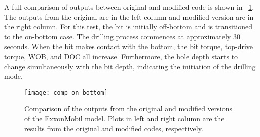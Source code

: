 A full comparison of outputs between original and modified code is shown in \figurename~\ref{Comaprison_on_bottom}.  The outputs from the original are in the left column and modified version are in the right column. For this test, the bit is initially off-bottom and is transitioned to the on-bottom case.  The drilling process commences at approximately 30 seconds. When the bit makes contact with the bottom, the bit torque, top-drive torque, WOB, and DOC all increase. Furthermore, the hole depth starts to change simultaneously with the bit depth, indicating the initiation of the drilling mode.
\begin{figure}
	\centering
	\texttt{[image: comp\_on\_bottom]}
    \caption[Output comparison of the original and modified model ExxonMobil model]{Comparison of the outputs from the original and modified versions of the ExxonMobil model. Plots in left and right column are the results from the original and modified codes, respectively.}
	\label{Comaprison_on_bottom}
\end{figure} 